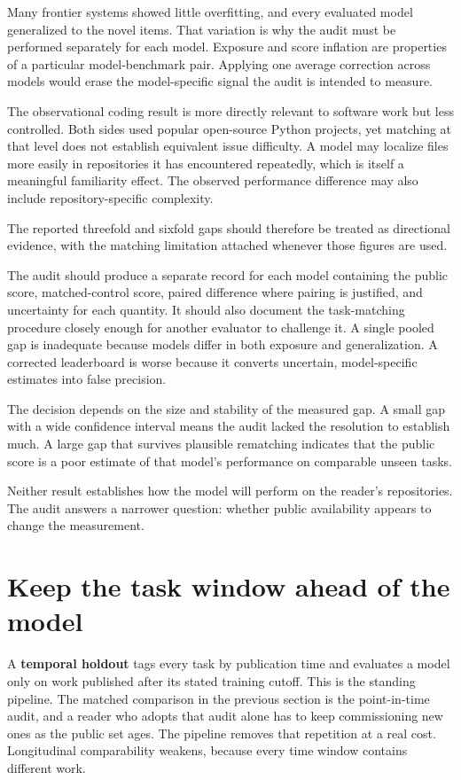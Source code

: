 Many frontier systems showed little overfitting, and every evaluated model generalized to the novel items. That variation is why the audit must be performed separately for each model. Exposure and score inflation are properties of a particular model-benchmark pair. Applying one average correction across models would erase the model-specific signal the audit is intended to measure.

The observational coding result is more directly relevant to software work but less controlled. Both sides used popular open-source Python projects, yet matching at that level does not establish equivalent issue difficulty. A model may localize files more easily in repositories it has encountered repeatedly, which is itself a meaningful familiarity effect. The observed performance difference may also include repository-specific complexity.

The reported threefold and sixfold gaps should therefore be treated as directional evidence, with the matching limitation attached whenever those figures are used.

The audit should produce a separate record for each model containing the public score, matched-control score, paired difference where pairing is justified, and uncertainty for each quantity. It should also document the task-matching procedure closely enough for another evaluator to challenge it. A single pooled gap is inadequate because models differ in both exposure and generalization. A corrected leaderboard is worse because it converts uncertain, model-specific estimates into false precision.

The decision depends on the size and stability of the measured gap. A small gap with a wide confidence interval means the audit lacked the resolution to establish much. A large gap that survives plausible rematching indicates that the public score is a poor estimate of that model's performance on comparable unseen tasks.

Neither result establishes how the model will perform on the reader's repositories. The audit answers a narrower question: whether public availability appears to change the measurement.

\section{Keep the task window ahead of the model}\label{keep-the-task-window-ahead-of-the-model}

A \textbf{temporal holdout} tags every task by publication time and evaluates a model only on work published after its stated training cutoff. This is the standing pipeline. The matched comparison in the previous section is the point-in-time audit, and a reader who adopts that audit alone has to keep commissioning new ones as the public set ages. The pipeline removes that repetition at a real cost. Longitudinal comparability weakens, because every time window contains different work.


